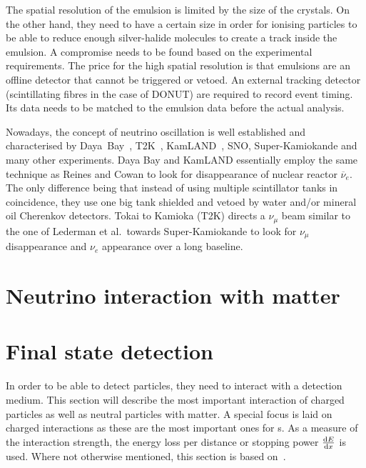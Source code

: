 The spatial resolution of the emulsion is limited by the size of the crystals.
On the other hand, they need to have a certain size in order for ionising particles to be able to reduce enough silver-halide molecules to create a track inside the emulsion.
A compromise needs to be found based on the experimental requirements.
The price for the high spatial resolution is that emulsions are an offline detector that cannot be triggered or vetoed.
An external tracking detector (scintillating fibres in the case of DONUT) are required to record event timing.
Its data needs to be matched to the emulsion data before the actual analysis.

Nowadays, the concept of neutrino oscillation is well established and characterised by Daya~Bay~\cite{dayabayRecent}, T2K~\cite{t2kOsc}, KamLAND~\cite{kamland}, SNO, Super-Kamiokande and many other experiments.
Daya Bay and KamLAND essentially employ the same technique as Reines and Cowan to look for disappearance of nuclear reactor $\overline{\nu}_e$.
The only difference being that instead of using multiple scintillator tanks in coincidence, they use one big tank shielded and vetoed by water and/or mineral oil Cherenkov detectors.
Tokai to Kamioka (T2K) directs a $\nu_{\mu}$ beam similar to the one of Lederman et al.\ towards Super-Kamiokande to look for $\nu_{\mu}$ disappearance and $\nu_e$ appearance over a long baseline.


\section{Neutrino interaction with matter\label{sec:nu-detection_interactions}}


\section{Final state detection\label{sec:nu_detection_fs}}
In order to be able to detect particles, they need to interact with a detection medium.
This section will describe the most important interaction of charged particles as well as neutral particles with matter.
A special focus is laid on charged interactions as these are the most important ones for \lartpc s.
As a measure of the interaction strength, the energy loss per distance or stopping power $\dv{E}{x}$ is used.
Where not otherwise mentioned, this section is based on~\cite{grupen}.

